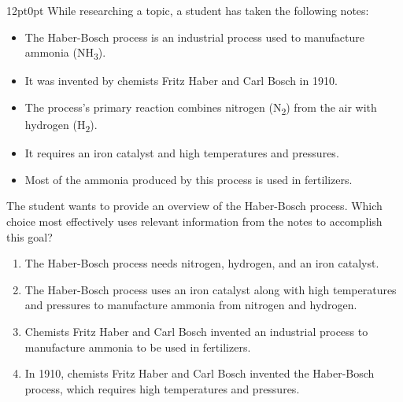 \documentclass[11pt, twocolumn]{article}
\newcounter{questionnum}
\begin{document}
\vspace{6pt}\noindent
\begin{minipage}{\columnwidth}\raggedright
\noindent{}\par\vspace{8pt}
\begin{adjustwidth}{12pt}{0pt}
While researching a topic, a student has taken the following notes:

\begin{itemize}

\item The Haber-Bosch process is an industrial process used to manufacture ammonia (NH\textsubscript{3}).

\item It was invented by chemists Fritz Haber and Carl Bosch in 1910.

\item The process's primary reaction combines nitrogen (N\textsubscript{2}) from the air with hydrogen (H\textsubscript{2}).

\item It requires an iron catalyst and high temperatures and pressures.

\item Most of the ammonia produced by this process is used in fertilizers.

\end{itemize}
\vspace{6pt}

The student wants to provide an overview of the Haber-Bosch process. Which choice most effectively uses relevant information from the notes to accomplish this goal?
\begin{enumerate}[label=\Alph*),leftmargin=18pt,topsep=3pt,itemsep=2pt]
  \item The Haber-Bosch process needs nitrogen, hydrogen, and an iron catalyst.
  \item The Haber-Bosch process uses an iron catalyst along with high temperatures and pressures to manufacture ammonia from nitrogen and hydrogen.
  \item Chemists Fritz Haber and Carl Bosch invented an industrial process to manufacture ammonia to be used in fertilizers.
  \item In 1910, chemists Fritz Haber and Carl Bosch invented the Haber-Bosch process, which requires high temperatures and pressures.
\end{enumerate}
\end{adjustwidth}
\end{minipage}\par
\end{document}
